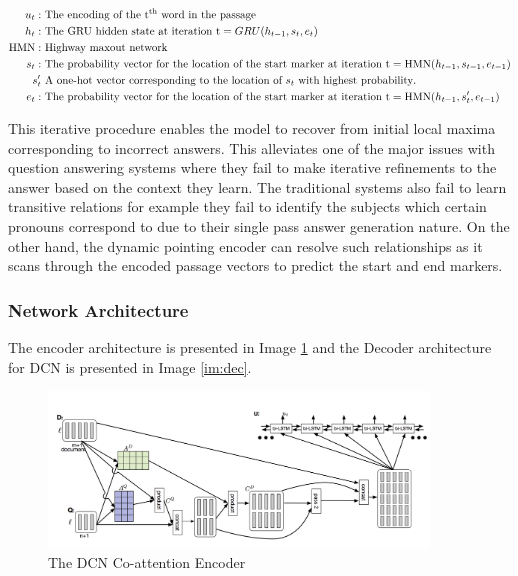 \begin{align*}
u_t: &\text{ The encoding of the t\textsuperscript{th} word in the passage} \\
h_t: &\text{ The GRU hidden state at iteration t} = GRU(h_{t - 1}, s_t, e_t) \\
\text{HMN}: &\text{ Highway maxout network} \\
s_t: &\text{ The probability vector for the location of the start marker at iteration t} = \text{HMN}(h_{t - 1}, s_{t - 1}, e_{t - 1}) \\
s_t' &\text{ A one-hot vector corresponding to the location of } s_t \text{ with highest probability}. \\
e_t: &\text{ The probability vector for the location of the start marker at iteration t} = \text{HMN}(h_{t - 1}, s_t', e_{t - 1})\\
\end{align*}

This iterative procedure enables the model to recover from initial local maxima corresponding to incorrect answers. This alleviates one of the major issues with question answering systems where they fail to make iterative refinements to the answer based on the context they learn. The traditional systems also fail to learn transitive relations for example they fail to identify the subjects which certain pronouns correspond to due to their single pass answer generation nature. On the other hand, the dynamic pointing encoder can resolve such relationships as it scans through the encoded passage vectors to predict the start and end markers.\\

\subsubsection{Network Architecture}
The encoder architecture is presented in Image \ref{im:enc} and the Decoder architecture for DCN is presented in Image \ref{im:dec}.

\begin{figure}[h]
    \centering
    \includegraphics[width=0.9\textwidth]{images/coattn_encoder.png}
    \caption{The DCN Co-attention Encoder}
    \label{im:enc}
\end{figure}

